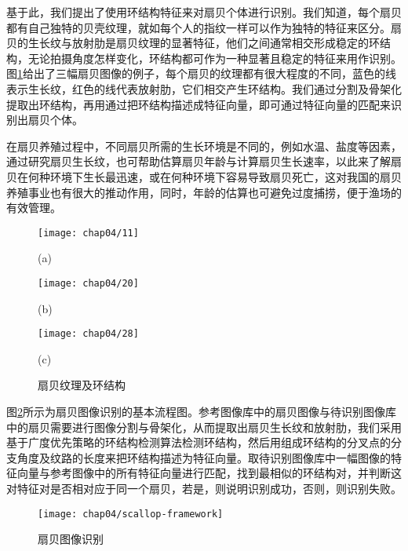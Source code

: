 基于此，我们提出了使用环结构特征来对扇贝个体进行识别。我们知道，每个扇贝都有自己独特的贝壳纹理，就如每个人的指纹一样可以作为独特的特征来区分。扇贝的生长纹与放射肋是扇贝纹理的显著特征，他们之间通常相交形成稳定的环结构，无论拍摄角度怎样变化，环结构都可作为一种显著且稳定的特征来用作识别。图\ref{fig:scallop}给出了三幅扇贝图像的例子，每个扇贝的纹理都有很大程度的不同，蓝色的线表示生长纹，红色的线代表放射肋，它们相交产生环结构。我们通过分割及骨架化提取出环结构，再用通过把环结构描述成特征向量，即可通过特征向量的匹配来识别出扇贝个体。

在扇贝养殖过程中，不同扇贝所需的生长环境是不同的，例如水温、盐度等因素，通过研究扇贝生长纹，也可帮助估算扇贝年龄\cite{hurley}与计算扇贝生长速率\cite{david}，以此来了解扇贝在何种环境下生长最迅速，或在何种环境下容易导致扇贝死亡，这对我国的扇贝养殖事业也有很大的推动作用，同时，年龄的估算也可避免过度捕捞，便于渔场的有效管理。

\begin{figure}
\centering
  \begin{minipage}[b]{0.3\textwidth} 
      \centering 
      \texttt{[image: chap04/11]}
        \centerline{(a)}\medskip
    \end{minipage}
  \begin{minipage}[b]{0.3\textwidth}
    \centering
    \texttt{[image: chap04/20]}
      \centerline{(b)}\medskip
  \end{minipage}
  \begin{minipage}[b]{0.3\textwidth}
    \centering
    \texttt{[image: chap04/28]}
      \centerline{(c)}\medskip
  \end{minipage}
\caption{扇贝纹理及环结构}
\label{fig:scallop}
\end{figure}



图\ref{fig:scallop-framework}所示为扇贝图像识别的基本流程图。参考图像库中的扇贝图像与待识别图像库中的扇贝需要进行图像分割与骨架化，从而提取出扇贝生长纹和放射肋，我们采用基于广度优先策略的环结构检测算法检测环结构，然后用组成环结构的分叉点的分支角度及纹路的长度来把环结构描述为特征向量。取待识别图像库中一幅图像的特征向量与参考图像中的所有特征向量进行匹配，找到最相似的环结构对，并判断这对特征对是否相对应于同一个扇贝，若是，则说明识别成功，否则，则识别失败。


\begin{figure}
  \centering
  \texttt{[image: chap04/scallop-framework]}
  \caption{扇贝图像识别}
  \label{fig:scallop-framework}
\end{figure}
